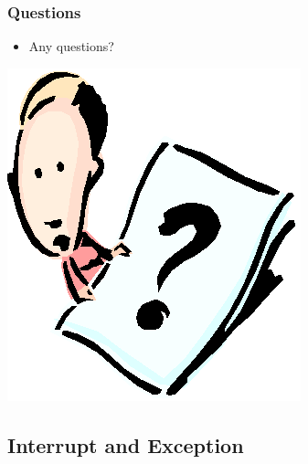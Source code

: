 \documentclass[CJKutf8,xcolor=pdftex,dvipsnames,table]{beamer}
\begin{document}
\begin{CJK*}{UTF8}{song}
  \begin{frame}
    \frametitle{Questions}
    \begin{itemize}
    \item{Any questions?}
    \end{itemize}
    \begin{center}
      \includegraphics[scale=.5]{question}
    \end{center}
  \end{frame}

  \subsection{Interrupt and Exception}


\end{CJK*}
\end{document}
